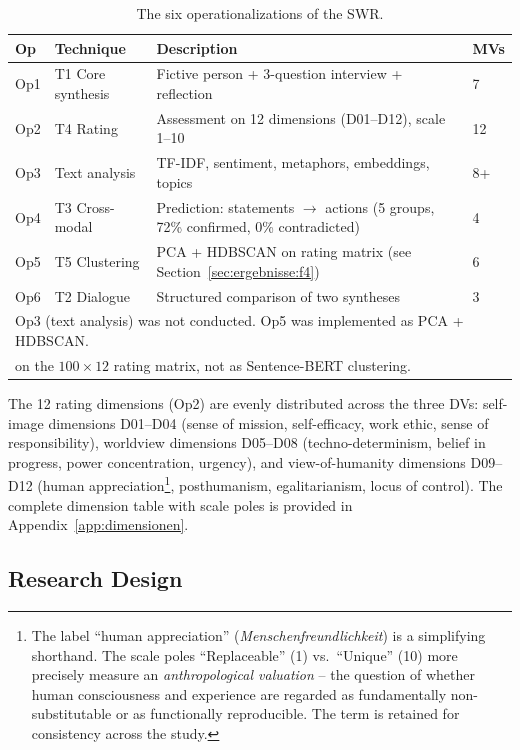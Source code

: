 \documentclass[12pt,a4paper]{article}
\begin{document}
\begin{table}[htbp]
  \centering
  \caption{The six operationalizations of the SWR.}
  \label{tab:ops}
  \small
  \begin{tabularx}{\textwidth}{l l X l}
    \toprule
    \textbf{Op} & \textbf{Technique} & \textbf{Description} & \textbf{MVs} \\
    \midrule
    Op1 & T1 Core synthesis & Fictive person + 3-question interview + reflection & 7 \\
    Op2 & T4 Rating & Assessment on 12 dimensions (D01--D12), scale 1--10 & 12 \\
    Op3 & Text analysis & TF-IDF, sentiment, metaphors, embeddings, topics & 8+ \\
    Op4 & T3 Cross-modal & Prediction: statements $\to$ actions (5 groups, 72\% confirmed, 0\% contradicted) & 4 \\
    Op5 & T5 Clustering & PCA + HDBSCAN on rating matrix (see Section~\ref{sec:ergebnisse:f4}) & 6 \\
    Op6 & T2 Dialogue & Structured comparison of two syntheses & 3 \\
    \bottomrule
    \multicolumn{4}{l}{\footnotesize Op3 (text analysis) was not conducted. Op5 was implemented as PCA + HDBSCAN.}\\
    \multicolumn{4}{l}{\footnotesize on the $100 \times 12$ rating matrix, not as Sentence-BERT clustering.}\\
  \end{tabularx}
\end{table}

The 12 rating dimensions (Op2) are evenly distributed across the three DVs: self-image dimensions D01--D04 (sense of mission, self-efficacy, work ethic, sense of responsibility), worldview dimensions D05--D08 (techno-determinism, belief in progress, power concentration, urgency), and view-of-humanity dimensions D09--D12 (human appreciation\footnote{The label ``human appreciation'' (\emph{Menschenfreundlichkeit}) is a simplifying shorthand. The scale poles ``Replaceable'' (1) vs.\ ``Unique'' (10) more precisely measure an \emph{anthropological valuation} -- the question of whether human consciousness and experience are regarded as fundamentally non-substitutable or as functionally reproducible. The term is retained for consistency across the study.}, posthumanism, egalitarianism, locus of control). The complete dimension table with scale poles is provided in Appendix~\ref{app:dimensionen}.


\subsection{Research Design}
\label{sec:methodik:design}
\end{document}
